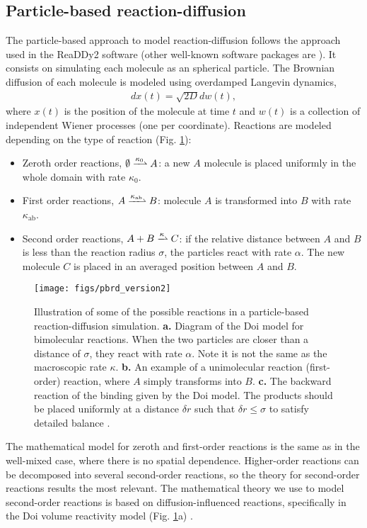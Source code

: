 \documentclass[10pt,twocolumn]{revtex4-1}
\begin{document}
	\subsection{Particle-based reaction-diffusion}\label{sec:PBA}
	The particle-based approach to model reaction-diffusion follows the approach used in the ReaDDy2 software \cite{hoffmann2019readdy} (other well-known software packages are \cite{andrews2010detailed,moraru2008virtual,stiles2001monte}). It consists on simulating each molecule as an spherical particle. The Brownian diffusion of each molecule is modeled using overdamped Langevin dynamics,
	\begin{align}
	dx(t) = \sqrt{2D}dw(t),
	\label{eq:odampedLang}
	\end{align} 
	where $x(t)$ is the position of the molecule at time $t$ and $w(t)$ is a collection of independent
	Wiener processes (one per coordinate). Reactions are modeled depending on the type of reaction (Fig. \ref{fig:pbrd}):  
	\begin{itemize}
		\item Zeroth order reactions, $\emptyset \xrightharpoonup[]{\kappa_0} A$: a new $A$ molecule is placed uniformly in the whole domain with rate $\kappa_0$.
		\item First order reactions, $ A \xrightharpoonup[]{\kappa_{\text{ab}}} B$: molecule $A$ is transformed into $B$ with rate $\kappa_\text{ab}$.
		\item Second order reactions, $ A + B \xrightharpoonup[]{\kappa} C$: if the relative distance between $A$ and $B$ is less than the reaction radius $\sigma$, the particles react with rate $\alpha$. The new molecule $C$ is placed in an averaged position between $A$ and $B$. 
	\end{itemize}
	\begin{figure}[ht]
		\center
		\texttt{[image: figs/pbrd\_version2]}
		\caption{Illustration of some of the possible reactions in a particle-based reaction-diffusion simulation. \textbf{a.} Diagram of the Doi model for bimolecular reactions. When the two particles are closer than a distance of $\sigma$, they react with rate $\alpha$. Note it is not the same as the macroscopic rate $\kappa$. \textbf{b.} An example of a unimolecular reaction (first-order) reaction, where $A$ simply transforms into $B$. \textbf{c.} The backward reaction of the binding given by the Doi model. The products should be placed uniformly at a distance $\delta r$ such that $\delta r \leq \sigma$ to satisfy detailed balance \cite{frohner2018reversible}.}
		\label{fig:pbrd}
	\end{figure}
	The mathematical model for zeroth and first-order reactions is the same as in the well-mixed case, where there is no spatial dependence. Higher-order reactions can be decomposed into several second-order reactions, so the theory for second-order reactions results the most relevant. The mathematical theory we use to model second-order reactions is based on diffusion-influenced reactions, specifically in the Doi volume reactivity model (Fig. \ref{fig:pbrd}a) \cite{doi1976stochastic, teramoto1967theory}.
	
\end{document}
